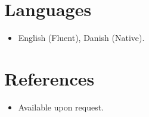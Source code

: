 \documentclass[11pt,a4paper,sans]{moderncv}
\begin{document}

\section{Languages}
\vspace{1pt}
\begin{itemize}
\item English (Fluent), Danish (Native).
\end{itemize}


\section{References}
\vspace{1pt}
\begin{itemize}
\item Available upon request.
\end{itemize}
\end{document}
